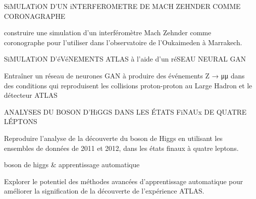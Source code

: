 


\begin{cventries}
          \cventry
      {SiMULATiON D'UN iNTERFEROMETRE DE MACH ZEHNDER COMME CORONAGRAPHE
      } %
    { } %
    {} %
    {} %
    {
      \begin{cvitems} %
        \item {construire une simulation d'un interféromètre Mach Zehnder comme coronographe pour l'utiliser dans l'observatoire de l'Oukaimeden à Marrakech.}
        \end{cvitems}
    }
      \cventry
      {SiMULATiON D'éVéNEMENTS ATLAS à l'aide d'un réSEAU NEURAL GAN
      } %
    { } %
    {} %
    {} %
    {
      \begin{cvitems} %
        \item {Entraîner un réseau de neurones GAN à produire des événements Z → μμ dans des conditions qui reproduisent les collisions proton-proton au Large Hadron et le détecteur ATLAS
        }
        \end{cvitems}
    }
  \cventry
      {ANALYSES DU BOSON D'HiGGS DANS LES ÉTATS FiNAUx DE QUATRE LÉPTONS
      } %
    {} %
    {} %
    {} %
    {
      \begin{cvitems} %
        \item {Reproduire l'analyse de la découverte du boson de Higgs en utilisant les ensembles de données de 2011 et 2012, dans les états finaux à quatre leptons.}
        \end{cvitems}
    }
      \cventry
      {boson de higgs \& apprentissage automatique
       } %
    { } %
    {} %
    {} %
    {
      \begin{cvitems} %
        \item {Explorer le potentiel des méthodes avancées d'apprentissage automatique pour améliorer la signification de la découverte de l'expérience ATLAS.}
        \end{cvitems}
    }
    

\end{cventries}
